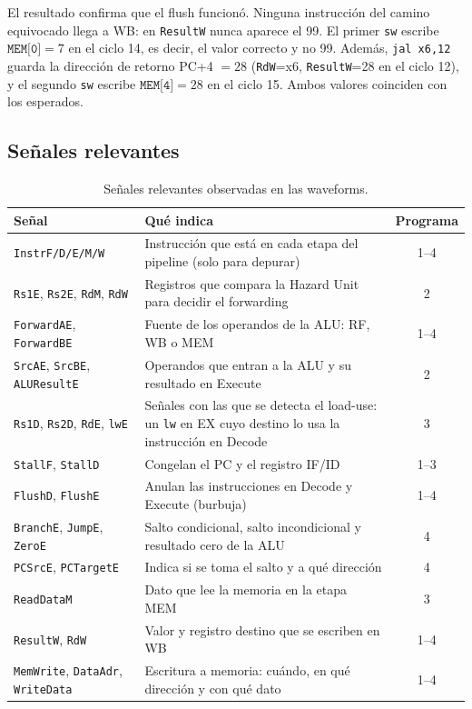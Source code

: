 \documentclass[12pt,a4paper]{article}
\begin{document}
El resultado confirma que el flush funcionó. Ninguna instrucción del camino equivocado llega a WB: en \texttt{ResultW} nunca aparece el 99. El primer \texttt{sw} escribe $\texttt{MEM[0]}=7$ en el ciclo 14, es decir, el valor correcto y no 99. Además, \texttt{jal x6,12} guarda la dirección de retorno PC+4 $=28$ (\texttt{RdW}=x6, \texttt{ResultW}=28 en el ciclo 12), y el segundo \texttt{sw} escribe $\texttt{MEM[4]}=28$ en el ciclo 15. Ambos valores coinciden con los esperados.


\subsection{Señales relevantes}

\begin{table}[H]
\centering
\begin{tabular}{lp{8.2cm}c}
\toprule
\textbf{Señal} & \textbf{Qué indica} & \textbf{Programa} \\
\midrule
\texttt{InstrF/D/E/M/W} & Instrucción que está en cada etapa del pipeline (solo para depurar) & 1--4 \\
\texttt{Rs1E}, \texttt{Rs2E}, \texttt{RdM}, \texttt{RdW} & Registros que compara la Hazard Unit para decidir el forwarding & 2 \\
\texttt{ForwardAE}, \texttt{ForwardBE} & Fuente de los operandos de la ALU: RF, WB o MEM & 1--4 \\
\texttt{SrcAE}, \texttt{SrcBE}, \texttt{ALUResultE} & Operandos que entran a la ALU y su resultado en Execute & 2 \\
\texttt{Rs1D}, \texttt{Rs2D}, \texttt{RdE}, \texttt{lwE} & Señales con las que se detecta el load-use: un \texttt{lw} en EX cuyo destino lo usa la instrucción en Decode & 3 \\
\texttt{StallF}, \texttt{StallD} & Congelan el PC y el registro IF/ID & 1--3 \\
\texttt{FlushD}, \texttt{FlushE} & Anulan las instrucciones en Decode y Execute (burbuja) & 1--4 \\
\texttt{BranchE}, \texttt{JumpE}, \texttt{ZeroE} & Salto condicional, salto incondicional y resultado cero de la ALU & 4 \\
\texttt{PCSrcE}, \texttt{PCTargetE} & Indica si se toma el salto y a qué dirección & 4 \\
\texttt{ReadDataM} & Dato que lee la memoria en la etapa MEM & 3 \\
\texttt{ResultW}, \texttt{RdW} & Valor y registro destino que se escriben en WB & 1--4 \\
\texttt{MemWrite}, \texttt{DataAdr}, \texttt{WriteData} & Escritura a memoria: cuándo, en qué dirección y con qué dato & 1--4 \\
\bottomrule
\end{tabular}
\caption{Señales relevantes observadas en las waveforms.}
\label{tab:senales}
\end{table}
\end{document}
